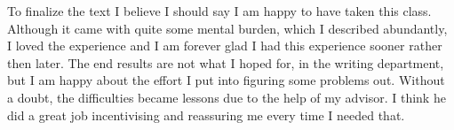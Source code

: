 To finalize the text I believe I should say I am happy to have taken this class. Although it came with quite some mental burden, which I described abundantly, I loved the experience and I am forever glad I had this experience sooner rather then later. The end results are not what I hoped for, in the writing department, but I am happy about the effort I put into figuring some problems out. Without a doubt, the difficulties became lessons due to the help of my advisor. I think he did a great job incentivising and reassuring me every time I needed that.















